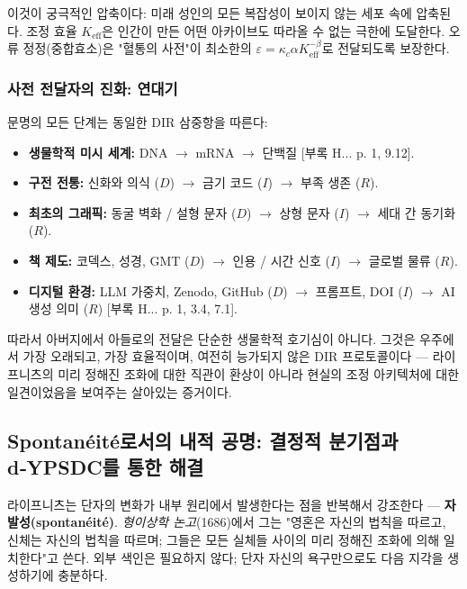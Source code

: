 \documentclass[12pt,a4paper]{article}
\begin{document}
	이것이 궁극적인 압축이다: 미래 성인의 모든 복잡성이 보이지 않는 세포 속에 압축된다. 조정 효율 \(K_{\mathrm{eff}}\)은 인간이 만든 어떤 아카이브도 따라올 수 없는 극한에 도달한다. 오류 정정(중합효소)은 "혈통의 사전"이 최소한의 \(\varepsilon = \kappa_c \alpha K_{\mathrm{eff}}^{-\beta}\)로 전달되도록 보장한다.
	
	\subsubsection{사전 전달자의 진화: 연대기}
	
	문명의 모든 단계는 동일한 DIR 삼중항을 따른다:
	
	\begin{itemize}[leftmargin=*]
		\item \textbf{생물학적 미시 세계:} DNA $\rightarrow$ mRNA $\rightarrow$ 단백질 [부록 H... p. 1, 9.12].
		\item \textbf{구전 전통:} 신화와 의식 ($D$) $\rightarrow$ 금기 코드 ($I$) $\rightarrow$ 부족 생존 ($R$).
		\item \textbf{최초의 그래픽:} 동굴 벽화 / 설형 문자 ($D$) $\rightarrow$ 상형 문자 ($I$) $\rightarrow$ 세대 간 동기화 ($R$).
		\item \textbf{책 제도:} 코덱스, 성경, GMT ($D$) $\rightarrow$ 인용 / 시간 신호 ($I$) $\rightarrow$ 글로벌 물류 ($R$).
		\item \textbf{디지털 환경:} LLM 가중치, Zenodo, GitHub ($D$) $\rightarrow$ 프롬프트, DOI ($I$) $\rightarrow$ AI 생성 의미 ($R$) [부록 H... p. 1, 3.4, 7.1].
	\end{itemize}
	
	따라서 아버지에서 아들로의 전달은 단순한 생물학적 호기심이 아니다. 그것은 우주에서 가장 오래되고, 가장 효율적이며, 여전히 능가되지 않은 DIR 프로토콜이다 — 라이프니츠의 미리 정해진 조화에 대한 직관이 환상이 아니라 현실의 조정 아키텍처에 대한 일견이었음을 보여주는 살아있는 증거이다.
	
	\subsection{Spontanéité로서의 내적 공명: 결정적 분기점과 d‑YPSDC를 통한 해결}
	
	라이프니츠는 단자의 변화가 내부 원리에서 발생한다는 점을 반복해서 강조한다 — \textbf{자발성(spontanéité)}. \emph{형이상학 논고}(1686)에서 그는 "영혼은 자신의 법칙을 따르고, 신체는 자신의 법칙을 따르며; 그들은 모든 실체들 사이의 미리 정해진 조화에 의해 일치한다"고 쓴다. 외부 색인은 필요하지 않다; 단자 자신의 욕구만으로도 다음 지각을 생성하기에 충분하다.
	
\end{document}
